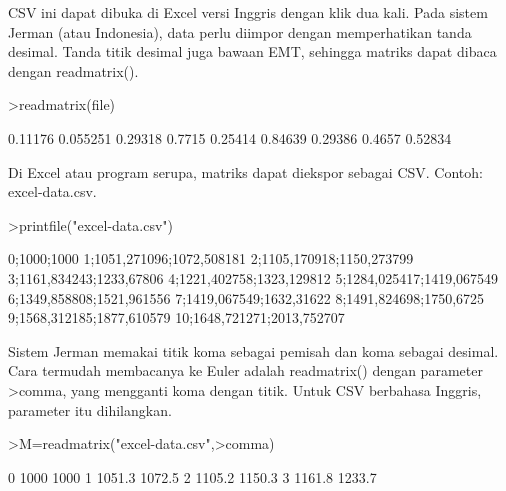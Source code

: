 \documentclass[a4paper,10pt]{article}
\begin{document}
\begin{eulernotebook}
\begin{eulercomment}
\begin{eulercomment}
\begin{eulercomment}
\begin{eulercomment}
\begin{eulercomment}
\begin{eulercomment}
\begin{eulercomment}
\begin{eulercomment}
\begin{eulercomment}
\begin{eulercomment}
\begin{eulercomment}
\begin{eulercomment}
\begin{eulercomment}
\begin{eulercomment}
\begin{eulercomment}
\begin{eulercomment}
\begin{eulercomment}
\begin{eulercomment}
\begin{eulercomment}
\begin{eulercomment}
\begin{eulercomment}
\begin{eulercomment}
\begin{eulercomment}
\begin{eulercomment}
\begin{eulercomment}
\begin{eulercomment}
\begin{euleroutput}
\end{euleroutput}
\begin{eulercomment}
CSV ini dapat dibuka di Excel versi Inggris dengan klik dua kali. Pada sistem Jerman (atau
Indonesia), data perlu diimpor dengan memperhatikan tanda desimal. Tanda titik desimal juga
bawaan EMT, sehingga matriks dapat dibaca dengan readmatrix().
\end{eulercomment}
\begin{eulerprompt}
>readmatrix(file)
\end{eulerprompt}
\begin{euleroutput}
    0.11176  0.055251   0.29318 
     0.7715   0.25414   0.84639 
    0.29386    0.4657   0.52834 
\end{euleroutput}
\begin{eulercomment}
Di Excel atau program serupa, matriks dapat diekspor sebagai CSV. Contoh: excel-data.csv.
\end{eulercomment}
\begin{eulerprompt}
>printfile("excel-data.csv")
\end{eulerprompt}
\begin{euleroutput}
  0;1000;1000
  1;1051,271096;1072,508181
  2;1105,170918;1150,273799
  3;1161,834243;1233,67806
  4;1221,402758;1323,129812
  5;1284,025417;1419,067549
  6;1349,858808;1521,961556
  7;1419,067549;1632,31622
  8;1491,824698;1750,6725
  9;1568,312185;1877,610579
  10;1648,721271;2013,752707
\end{euleroutput}
\begin{eulercomment}
Sistem Jerman memakai titik koma sebagai pemisah dan koma sebagai desimal. Cara termudah
membacanya ke Euler adalah readmatrix() dengan parameter \textgreater{}comma, yang mengganti koma dengan
titik. Untuk CSV berbahasa Inggris, parameter itu dihilangkan.
\end{eulercomment}
\begin{eulerprompt}
>M=readmatrix("excel-data.csv",>comma)
\end{eulerprompt}
\begin{euleroutput}
          0      1000      1000 
          1    1051.3    1072.5 
          2    1105.2    1150.3 
          3    1161.8    1233.7 

\end{euleroutput}
\end{eulercomment}
\end{eulercomment}
\end{eulercomment}
\end{eulercomment}
\end{eulercomment}
\end{eulercomment}
\end{eulercomment}
\end{eulercomment}
\end{eulercomment}
\end{eulercomment}
\end{eulercomment}
\end{eulercomment}
\end{eulercomment}
\end{eulercomment}
\end{eulercomment}
\end{eulercomment}
\end{eulercomment}
\end{eulercomment}
\end{eulercomment}
\end{eulercomment}
\end{eulercomment}
\end{eulercomment}
\end{eulercomment}
\end{eulercomment}
\end{eulercomment}
\end{eulercomment}
\end{eulernotebook}
\end{document}
